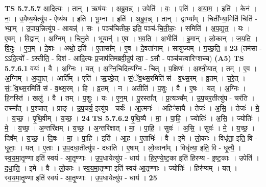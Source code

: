 \documentclass[17pt]{extarticle}
\begin{document}
                  \newline
                                \textbf{ TS 5.7.5.7} \newline
                  आ॒दि॒त्यः । तान् । ऋष॑यः । अ॒ब्रु॒व॒न्न् । उपेति॑ । वः॒ । एति॑ । अ॒या॒म॒ । इति॑ । केन॑ । नः॒ । उ॒पैष्य॒थेत्यु॑प - ऐष्य॑थ । इति॑ । भू॒म्ना । इति॑ । अ॒ब्रु॒व॒न्न् । तान् । द्वाभ्या᳚म् । चिती᳚भ्या॒मिति॑ चिति॑ - भ्या॒म् । उ॒पाय॒न्नित्यु॑प - आयन्न्॑ । सः । पञ्च॑चितीक॒ इति॒ पञ्च॑-चि॒ती॒कः॒ । समिति॑ । अ॒प॒द्य॒त॒ । यः । ए॒वम् । वि॒द्वान् । अ॒ग्निम् । चि॒नु॒ते । भूयान्॑ । ए॒व । भ॒व॒ति॒ । अ॒भीति॑ । इ॒मान् । लो॒कान् । ज॒य॒ति॒ । वि॒दुः । ए॒न॒म् । दे॒वाः । अथो॒ इति॑ । ए॒तासा᳚म् । ए॒व । दे॒वता॑नाम् । सायु॑ज्यम् । ग॒च्छ॒ति॒ ॥ \textbf{  23 } \newline
                  \newline
                       (तम॑सा - ऽऽदि॒त्यो᳚ - ऽस्तीति॒ - दिश॑ - आदि॒त्यः प्र॒जाप॑तिमब्रवी॒दुप॑ त्वा॒ - ऽसौ - पञ्च॑चत्वारिꣳशच्च)  \textbf{(A5)} \newline \newline
                                \textbf{ TS 5.7.6.1} \newline
                  वयः॑ । वै । अ॒ग्निः । यत् । अ॒ग्नि॒चिदित्य॑ग्नि - चित् । प॒क्षिणः॑ । अ॒श्नी॒यात् । तम् । ए॒व । अ॒ग्निम् । अ॒द्या॒त् । आर्ति᳚म् । एति॑ । ऋ॒च्छे॒त् । सं॒ॅव॒थ्स॒रमिति॑ सं - व॒थ्स॒रम् । व्र॒तम् । च॒रे॒त् । सं॒ॅव॒थ्स॒रमिति॑ सं - व॒थ्स॒रम् । हि । व्र॒तम् । न । अतीति॑ । प॒शुः । वै । ए॒षः । यत् । अ॒ग्निः । हि॒नस्ति॑ । खलु॑ । वै । तम् । प॒शुः । यः । ए॒न॒म् । पु॒रस्ता᳚त् । प्र॒त्यञ्च᳚म् । उ॒प॒चर॒तीत्यु॑प - चर॑ति । तस्मा᳚त् । प॒श्चात् । प्राङ् । उ॒प॒चर्य॒ इत्यु॑प - चर्यः॑ । आ॒त्मनः॑ । अहिꣳ॑सायै । तेजः॑ । अ॒सि॒ । तेजः॑ । मे॒ । य॒च्छ॒ । पृ॒थि॒वीम् । य॒च्छ॒ । \textbf{  24} \newline
                  \newline
                                \textbf{ TS 5.7.6.2} \newline
                  पृ॒थि॒व्यै । मा॒ । पा॒हि॒ । ज्योतिः॑ । अ॒सि॒ । ज्योतिः॑ । मे॒ । य॒च्छ॒ । अ॒न्तरि॑क्षम् । य॒च्छ॒ । अ॒न्तरि॑क्षात् । मा॒ । पा॒हि॒ । सुवः॑ । अ॒सि॒ । सुवः॑ । मे॒ । य॒च्छ॒ । दिव᳚म् । य॒च्छ॒ । दि॒वः । मा॒ । पा॒हि॒ । इति॑ । आ॒ह॒ । ए॒ताभिः॑ । वै । इ॒मे । लो॒काः । विधृ॑ता॒ इति॒ वि - धृ॒ताः॒ । यत् । ए॒ताः । उ॒प॒दधा॒तीत्यु॑प - दधा॑ति । ए॒षाम् । लो॒काना᳚म् । विधृ॑त्या॒ इति॒ वि - धृ॒त्यै॒ । स्व॒य॒मा॒तृ॒ण्णा इति॑ स्वयं - आ॒तृ॒ण्णाः । उ॒प॒धायेत्यु॑प - धाय॑ । हि॒र॒ण्ये॒ष्ट॒का इति॑ हिरण्य - इ॒ष्ट॒काः । उपेति॑ । द॒धा॒ति॒ । इ॒मे । वै । लो॒काः । स्व॒य॒मा॒तृ॒ण्णा इति॑ स्वयं-आ॒तृ॒ण्णाः । ज्योतिः॑ । हिर॑ण्यम् । यत् । स्व॒य॒मा॒तृ॒ण्णा इति॑ स्वयं - आ॒तृ॒ण्णाः । उ॒प॒धायेत्यु॑प - धाय॑ । \textbf{  25} \newline
\end{document}
